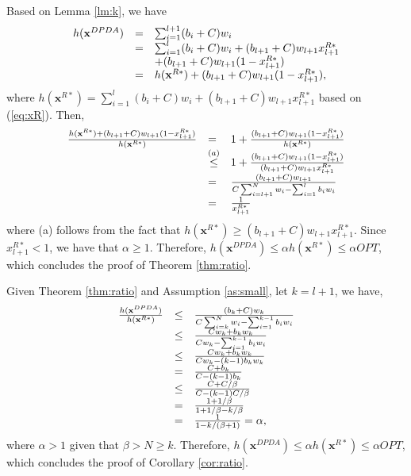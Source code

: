 	Based on Lemma \ref{lm:k}, we have
	\begin{equation}%
	\hspace{-0.0cm}
	\begin{array}
	[c]{lll}%
	h(\mathbf{x}^{DPDA})&=&\sum_{i=1}^{l+1}(b_i+C)w_i\\
	&=&\sum_{i=1}^{l}(b_i+C)w_i+(b_{l+1}+C)w_{l+1}x_{l+1}^{R*}\\
	&&+(b_{l+1}+C)w_{l+1}(1-x_{l+1}^{R*})\\
	&=&h(\mathbf{x}^{R*})+(b_{l+1}+C)w_{l+1}(1-x_{l+1}^{R*}),
	\end{array}
	\label{eq:h}
	\end{equation}
	where $h(\mathbf{x}^{R*})=\sum_{i=1}^{l}(b_i+C)w_i+(b_{l+1}+C)w_{l+1}x_{l+1}^{R*}$ based on (\ref{eq:xR}). Then,
	\begin{equation}%
	\hspace{-0.0cm}
	\begin{array}
	[c]{lll}%
	\frac{h(\mathbf{x}^{R*})+(b_{l+1}+C)w_{l+1}(1-x_{l+1}^{R*})}{h(\mathbf{x}^{R*})}
	&=& 1+ \frac{(b_{l+1}+C)w_{l+1}(1-x_{l+1}^{R*})}{h(\mathbf{x}^{R*})}\\
	&\mathop{\le}\limits^{(a)}&  1+ \frac{(b_{l+1}+C)w_{l+1}(1-x_{l+1}^{R*})}{(b_{l+1}+C)w_{l+1}x_{l+1}^{R*}}\\
	&=&\frac{(b_{l+1}+C)w_{l+1}}{C\sum_{i=l+1}^N w_i-\sum_{i=1}^{l} b_iw_i}\\
	&=&\frac{1}{x_{l+1}^{R*}}
	\end{array}
	\label{eq:h}
	\end{equation}
	where (a) follows from the fact that $h(\mathbf{x}^{R*})\ge (b_{l+1}+C)w_{l+1}x_{l+1}^{R*}$. Since $x_{l+1}^{R*}<1$, we have that $\alpha\geq 1$. Therefore, $h(\mathbf{x}^{DPDA})\leq\alpha h(\mathbf{x}^{R*})\leq \alpha OPT$, which concludes the proof of Theorem \ref{thm:ratio}. 
	
	Given Theorem \ref{thm:ratio} and Assumption \ref{as:small}, let $k=l+1$, we have,
	\begin{equation}%
	\hspace{-0.0cm}
	\begin{array}
	[c]{lll}%
	\frac{h(\mathbf{x}^{DPDA})}{h(\mathbf{x}^{R*})}
	&\leq&\frac{(b_{k}+C)w_{k}}{C\sum_{i=k}^N w_i-\sum_{i=1}^{k-1} b_iw_i}\\
	&\leq& \frac{Cw_{k}+b_kw_k}{C w_k-\sum_{i=1}^{k-1} b_iw_i}\\
	&\leq& \frac{Cw_{k}+b_kw_k}{C w_k-(k-1)b_kw_k}\\
	&=& \frac{C+b_k}{C-(k-1)b_k}\\
	&\leq&\frac{C+C/\beta}{C-(k-1)C/\beta}\\
	&=&\frac{1+1/\beta}{1+1/\beta-k/\beta}\\
	&=&\frac{1}{1-k/(\beta+1)}=\alpha,
	\end{array}
	\label{eq:h}
	\end{equation}
	where $\alpha > 1$ given that $\beta>N\geq k$. Therefore, $h(\mathbf{x}^{DPDA})\leq \alpha h(\mathbf{x}^{R*})\leq \alpha OPT$, which concludes the proof of Corollary \ref{cor:ratio}.



